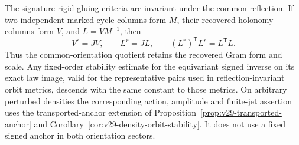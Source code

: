 \begin{corollary}
\label{cor:v28-quotient-holonomy-stability}
The signature-rigid gluing criteria are invariant under the common
reflection.  If two independent marked cycle columns form \(M\), their
recovered holonomy columns form \(V\), and \(L=VM^{-1}\), then
\begin{equation}\label{eq:v28-lattice-equivariance}
 V^r=JV,\qquad L^r=JL,\qquad (L^r)^{\mathsf T}L^r=L^{\mathsf T}L.
\end{equation}
Thus the common-orientation quotient retains the recovered Gram form and
scale.  Any fixed-order stability estimate for the equivariant signed
inverse on its exact law image, valid for the representative pairs used in
reflection-invariant orbit metrics, descends with the same constant to those
metrics.  On arbitrary perturbed densities the corresponding action,
amplitude and finite-jet assertion uses the transported-anchor extension of
Proposition~\ref{prop:v29-transported-anchor} and
Corollary~\ref{cor:v29-density-orbit-stability}.  It does not use a fixed
signed anchor in both orientation sectors.
\end{corollary}

